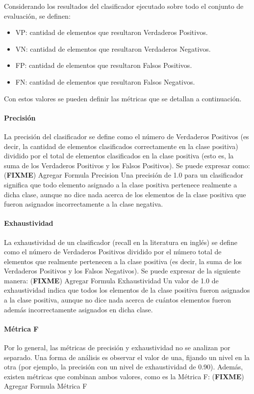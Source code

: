 \documentclass[a4paper,11pt,spanish]{book}
\newcommand*{\FIXME}[1]{{(\textbf{FIXME}) {#1}}}
\begin{document}
	  Considerando los resultados del clasificador ejecutado sobre todo el conjunto de evaluación, se definen:
	  \begin{itemize}	
	    \item VP: cantidad de elementos que resultaron Verdaderos Positivos.
	    \item VN: cantidad de elementos que resultaron Verdaderos Negativos.
	    \item FP: cantidad de elementos que resultaron Falsos Positivos.
	    \item FN: cantidad de elementos que resultaron Falsos Negativos.
	  \end{itemize}	  
	  
	  Con estos valores se pueden definir las métricas que se detallan a continuación.
	  
	  \paragraph { Precisión }
	    La precisión del clasificador se define como el número de Verdaderos Positivos (es decir, la cantidad de elementos clasificados correctamente en la clase positiva)
	    dividido por el total de elementos clasificados en la clase positiva (esto es, la suma de los Verdaderos Positivos y los Falsos Positivos). Se puede expresar como:
	    \FIXME{Agregar Formula Precision}
	    Una precisión de 1.0 para un clasificador significa que todo elemento asignado a la clase positiva pertenece realmente a dicha clase, aunque no dice nada acerca
	    de los elementos de la clase positiva que fueron asignados incorrectamente a la clase negativa.
	  
	  \paragraph { Exhaustividad }  
	    La exhaustividad de un clasificador (recall en la literatura en inglés) se define como el número de Verdaderos Positivos dividido por el número total de elementos que 
	    realmente pertenecen a la clase positiva (es decir, la suma de los Verdaderos Positivos y los Falsos Negativos). Se puede expresar de la siguiente manera:
	    \FIXME{Agregar Formula Exhaustividad}
	    Un valor de 1.0 de exhaustividad indica que todos los elementos de la clase positiva fueron asignados a la clase positiva, aunque no dice nada acerca de cuántos elementos 
	    fueron además incorrectamente asignados en dicha clase.
	  
	  \paragraph { Métrica F }
	    Por lo general, las métricas de precisión y exhaustividad no se analizan por separado. Una forma de análisis es observar el valor de una, fijando un nivel en la otra 
	    (por ejemplo, la precisión con un nivel de exhaustividad de 0.90). Además, existen métricas que combinan ambos valores, como es la Métrica F:
	    \FIXME{Agregar Formula Métrica F}
	  
\end{document}
